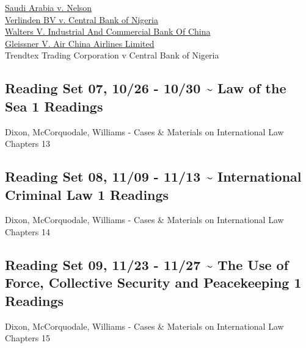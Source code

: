\documentclass[10pt,]{article}
\begin{document}
\href{https://scholar.google.com/scholar_case?case=15997705832480823650}{Saudi
Arabia v. Nelson}\\
\href{https://scholar.google.com/scholar_case?case=12305885770783175808}{Verlinden
BV v. Central Bank of Nigeria}\\
\href{https://www.courtlistener.com/opinion/2502147/walters-v-industrial-and-commercial-bank-of-china/}{Walters
V. Industrial And Commercial Bank Of China}\\
\href{https://scholar.google.com/scholar_case?case=3908553268744923367}{Gleissner
V. Air China Airlines Limited}\\
Trendtex Trading Corporation v Central Bank of Nigeria

\hypertarget{reading-set-07-1026---1030-law-of-the-sea-1-readings}{%
\subsection{Reading Set 07, 10/26 - 10/30 \textasciitilde{} Law of the
Sea \textbar{} 1
Readings}\label{reading-set-07-1026---1030-law-of-the-sea-1-readings}}

Dixon, McCorquodale, Williams - Cases \& Materials on International Law
Chapters 13

\hypertarget{reading-set-08-1109---1113-international-criminal-law-1-readings}{%
\subsection{Reading Set 08, 11/09 - 11/13 \textasciitilde{}
International Criminal Law \textbar{} 1
Readings}\label{reading-set-08-1109---1113-international-criminal-law-1-readings}}

Dixon, McCorquodale, Williams - Cases \& Materials on International Law
Chapters 14

\hypertarget{reading-set-09-1123---1127-the-use-of-force-collective-security-and-peacekeeping-1-readings}{%
\subsection{Reading Set 09, 11/23 - 11/27 \textasciitilde{} The Use of
Force, Collective Security and Peacekeeping \textbar{} 1
Readings}\label{reading-set-09-1123---1127-the-use-of-force-collective-security-and-peacekeeping-1-readings}}

Dixon, McCorquodale, Williams - Cases \& Materials on International Law
Chapters 15
\end{document}
